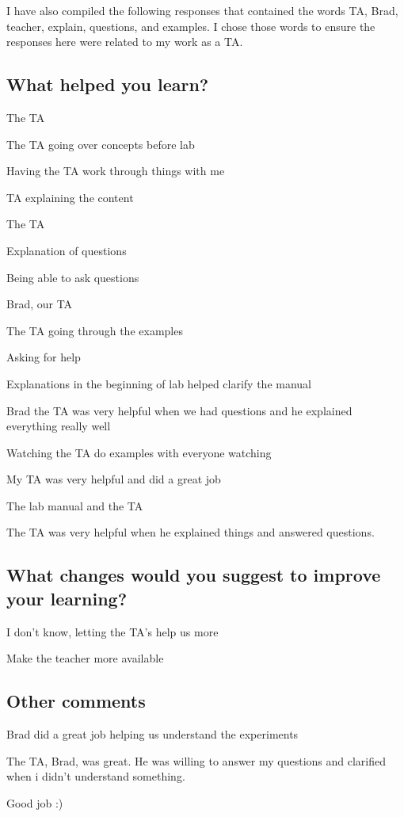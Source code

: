 \documentclass{article}
\begin{document}
\newpage
I have also compiled the following responses that contained the words TA, Brad, teacher, explain, questions, and examples. I chose those words to ensure the responses here were related to my work as a TA. 

\subsection{What helped you learn?}
\hspace{0.5cm}The TA

The TA going over concepts before lab

Having the TA work through things with me

TA explaining the content

The TA

Explanation of questions

Being able to ask questions

Brad, our TA

The TA going through the examples

Asking for help

Explanations in the beginning of lab helped clarify the manual

Brad the TA was very helpful when we had questions and he explained everything really well

Watching the TA do examples with everyone watching

My TA was very helpful and did a great job

The lab manual and the TA

The TA was very helpful when he explained things and answered questions. 

\subsection{What changes would you suggest to improve your learning?}

\hspace{0.5cm}I don't know, letting the TA's help us more

Make the teacher more available

\subsection{Other comments}

\hspace{0.5cm}Brad did a great job helping us understand the experiments

The TA, Brad, was great. He was willing to answer my questions and clarified when i didn't understand something.

Good job :)
\end{document}
